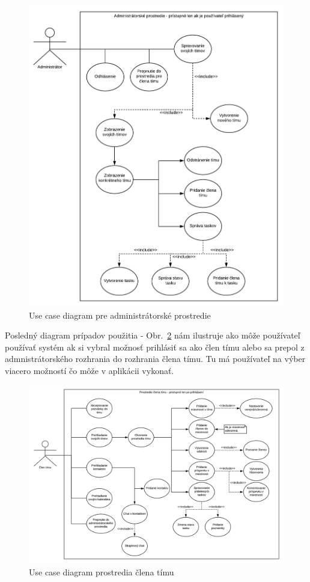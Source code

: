 \begin{figure}[H]
    \centering
    \includegraphics[scale=0.45]{img/DP_use_case_administrator.png}
    \caption{Use case diagram pre administrátorské prostredie}
    \label{fig:use_case_administrator}
\end{figure}

\indent Posledný diagram prípadov použitia - Obr.~\ref{fig:use_case_clen_timu} nám ilustruje ako môže používateľ používať systém ak si vybral možnosť prihlásiť sa ako člen tímu alebo sa prepol z admnistrátorského rozhrania do rozhrania člena tímu. Tu má používateľ na výber viacero možností čo môže v aplikácii vykonať.

\begin{figure}[H]
    \centering
    \includegraphics[scale=0.45]{img/DP_use_case_clen_timu.png}
    \caption{Use case diagram prostredia člena tímu}
    \label{fig:use_case_clen_timu}
\end{figure}

